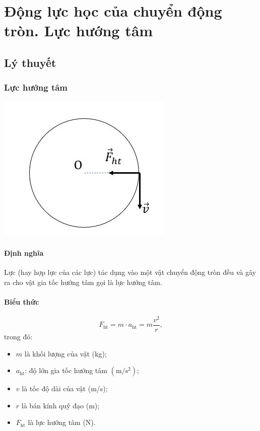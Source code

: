 \let\lesson\undefined
\newcommand{\lesson}{\phantomlesson{Bài 21: Động lực học của chuyển động tròn. Lực hướng tâm}}
\chapter[Động lực học của chuyển động tròn. Lực hướng tâm]{Động lực học của chuyển động tròn. Lực hướng tâm}
\setcounter{section}{0}
\section{Lý thuyết}
\subsection{Lực hướng tâm}
\begin{center}
	\includegraphics[scale=0.6]{../figs/VN10-PH-16-L-013-1-V2-04.JPG}
\end{center}
\subsubsection{Định nghĩa}
Lực (hay hợp lực của các lực) tác dụng vào một vật chuyển động tròn đều và gây ra cho vật gia tốc hướng tâm gọi là lực hướng tâm.
\subsubsection{Biểu thức}

\begin{equation*}
	F_{\text{ht}} = m \cdot a_{\text{ht}} = m\dfrac{v^2}{r},
\end{equation*}
trong đó:
\begin{itemize}
	\item $m$ là khối lượng của vật (kg); 
	\item $a_{\text{ht}}$: độ lớn gia tốc hướng tâm $\left(\si{\meter/\second^2}\right)$;
	\item $v$ là tốc độ dài của vật (m/s);
	\item $r$ là bán kính quỹ đạo (m);
	\item $F_{\text{ht}}$ là lực hướng tâm (N).
\end{itemize}
